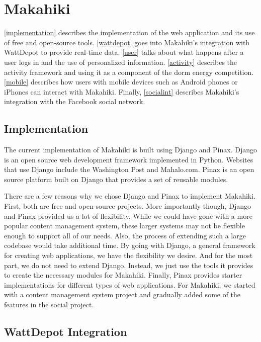 \chapter{Makahiki}
\label{makahiki}

\autoref{implementation} describes the implementation of the web application and its use of free and open-source tools.  \autoref{wattdepot} goes into Makahiki's integration with WattDepot to provide real-time data.  \autoref{user} talks about what happens after a user logs in and the use of personalized information.  \autoref{activity} describes the activity framework and using it as a component of the dorm energy competition.  \autoref{mobile} describes how users with mobile devices such as Android phones or iPhones can interact with Makahiki. Finally, \autoref{socialint} describes Makahiki's integration with the Facebook social network.

\section{Implementation}
\label{implementation}

The current implementation of Makahiki is built using Django and Pinax.  Django\cite{django} is an open source web development framework implemented in Python.  Websites that use Django include the Washington Post and Mahalo.com\cite{djangosites-mahalo}.  Pinax\cite{pinax} is an open source platform built on Django that provides a set of reusable modules.

There are a few reasons why we chose Django and Pinax to implement Makahiki.  First, both are free and open-source projects.  More importantly though, Django and Pinax provided us a lot of flexibility.  While we could have gone with a more popular content management system, these larger systems may not be flexible enough to support all of our needs.  Also, the process of extending such a large codebase would take additional time.  By going with Django, a general framework for creating web applications, we have the flexibility we desire.  And for the most part, we do not need to extend Django.  Instead, we just use the tools it provides to create the necessary modules for Makahiki.  Finally, Pinax provides starter implementations for different types of web applications.  For Makahiki, we started with a content management system project and gradually added some of the features in the social project.

\section{WattDepot Integration}
\label{wattdepot}

